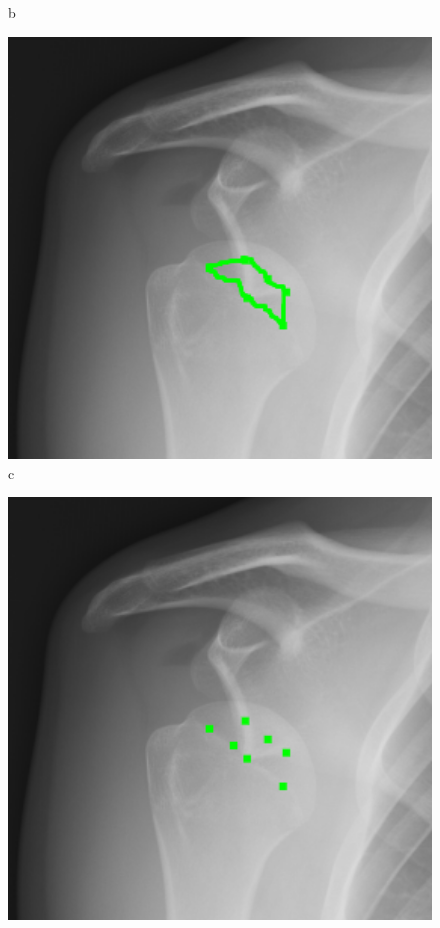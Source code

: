 \documentclass[a4paper,11pt,twoside,openright]{report}
\theoremstyle{definition}
\begin{document}
\begin{figure}[h!]
\begin{center}
\begin{center}
		b
	\end{center}
	\endminipage\hfill
	\begin{center}
		\includegraphics[width=1.0\textwidth]{181}
		c
	\end{center}
	\endminipage\hfill
	\begin{center}
		\includegraphics[width=1.0\textwidth]{182}

\end{center}
\end{center}
\end{figure}
\end{document}
